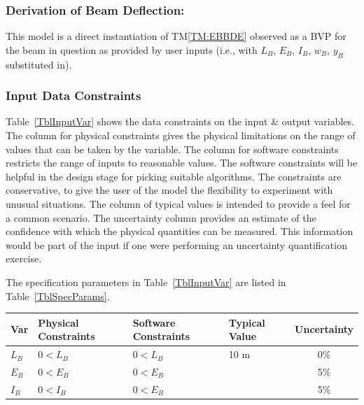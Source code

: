 \documentclass[12pt]{article}
\newcommand{\tref}[1]{TM\ref{#1}}
\begin{document}
\subsubsection*{Derivation of Beam Deflection:}

This model is a direct instantiation of \tref{TM:EBBDE} observed as a BVP for
the beam in question as provided by user inputs (i.e., with $L_B$, $E_B$, $I_B$,
$w_B$, $y_B$ substituted in).

\subsubsection{Input Data Constraints}
\label{sec_DataConstraints}

Table~\ref{TblInputVar} shows the data constraints on the input \& output
variables.  The column for physical constraints gives the physical limitations
on the range of values that can be taken by the variable.  The column for
software constraints restricts the range of inputs to reasonable values.  The
software constraints will be helpful in the design stage for picking suitable
algorithms.  The constraints are conservative, to give the user of the model the
flexibility to experiment with unusual situations.  The column of typical values
is intended to provide a feel for a common scenario.  The uncertainty column
provides an estimate of the confidence with which the physical quantities can be
measured.  This information would be part of the input if one were performing an
uncertainty quantification exercise.

The specification parameters in Table~\ref{TblInputVar} are listed in
Table~\ref{TblSpecParams}.

\begin{table}[H]
    \caption{Input Variables} \label{TblInputVar}
    \renewcommand{\arraystretch}{1.2}
    \noindent
    \begin{longtable*}{l l l l c}
        \toprule
        \textbf{Var} & \textbf{Physical Constraints} & \textbf{Software Constraints} & \textbf{Typical Value} & \textbf{Uncertainty}\\
        \midrule
        $L_B$        & $0 < L_B$ & $0 < L_B$ & 10 \si[per-mode=symbol]{\metre} & 0\% \\
        $E_B$        & $0 < E_B$ & $0 < E_B$ & \textemdash{} & 5\% \\
        $I_B$        & $0 < I_B$ & $0 < E_B$ & \textemdash{} & 5\% \\
        \bottomrule
    \end{longtable*}
\end{table}
\end{document}
